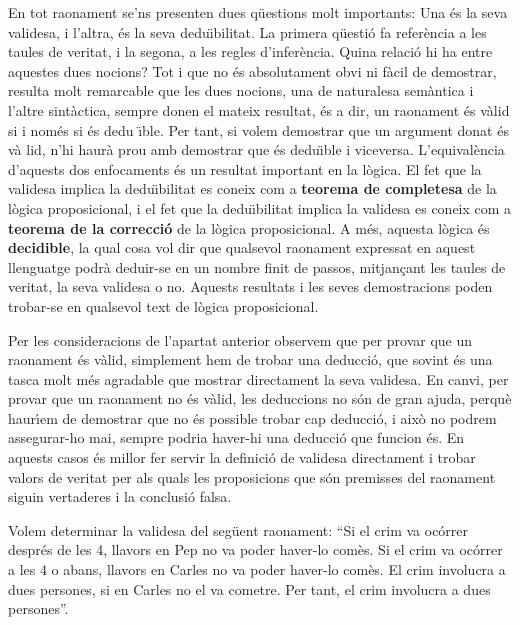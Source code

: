 En tot raonament se'ns presenten dues q\"{u}estions molt importants: Una
\'{e}s la seva validesa, i l'altra, \'{e}s la seva dedu\"{\i}bilitat. La
primera q\"{u}esti\'{o} fa refer\`{e}ncia a les taules de veritat, i la
segona, a les regles d'infer\`{e}ncia. Quina relaci\'{o} hi ha entre
aquestes dues nocions? Tot i que no \'{e}s absolutament obvi ni f\`{a}cil de
demostrar, resulta molt remarcable que les dues nocions, una de naturalesa
sem\`{a}ntica i l'altre sint\`{a}ctica, sempre donen el mateix resultat,
\'{e}s a dir, un raonament \'{e}s v\`{a}lid si i nom\'{e}s si \'{e}s dedu%
\"{\i}ble. Per tant, si volem demostrar que un argument donat \'{e}s v\`{a}%
lid, n'hi haur\`{a} prou amb demostrar que \'{e}s dedu\"{\i}ble i viceversa.
L'equival\`{e}ncia d'aquests dos enfocaments \'{e}s un resultat important en
la l\`{o}gica. El fet que la validesa implica la dedu\"{\i}bilitat es coneix
com a \textbf{teorema de completesa} de la l\`{o}gica proposicional, i el
fet que la dedu\"{\i}bilitat implica la validesa es coneix com a \textbf{%
teorema de la correcci\'{o}} de la l\`{o}gica proposicional. A m\'{e}s,
aquesta l\`{o}gica \'{e}s \textbf{decidible}, la qual cosa vol dir que
qualsevol raonament expressat en aquest llenguatge podr\`{a} deduir-se en un
nombre finit de passos, mitjan\c{c}ant les taules de veritat, la seva
validesa o no. Aquests resultats i les seves demostracions poden trobar-se
en qualsevol text de l\`{o}gica proposicional.

\bigskip

Per les consideracions de l'apartat anterior observem que per provar que un
raonament \'{e}s v\`{a}lid, simplement hem de trobar una deducci\'{o}, que
sovint \'{e}s una tasca molt m\'{e}s agradable que mostrar directament la
seva validesa. En canvi, per provar que un raonament no \'{e}s v\`{a}lid,
les deduccions no s\'{o}n de gran ajuda, perqu\`{e} haur\'{\i}em de
demostrar que no \'{e}s possible trobar cap deducci\'{o}, i aix\`{o} no
podrem assegurar-ho mai, sempre podria haver-hi una deducci\'{o} que funcion%
\'{e}s. En aquests casos \'{e}s millor fer servir la definici\'{o} de
validesa directament i trobar valors de veritat per als quals les
proposicions que s\'{o}n premisses del raonament siguin vertaderes i la
conclusi\'{o} falsa.

\begin{exem}
Volem determinar la validesa del seg\"{u}ent raonament: \textquotedblleft Si
el crim va oc\'{o}rrer despr\'{e}s de les 4, llavors en Pep no va poder
haver-lo com\`{e}s. Si el crim va oc\'{o}rrer a les 4 o abans, llavors en
Carles no va poder haver-lo com\`{e}s. El crim involucra a dues persones, si
en Carles no el va cometre. Per tant, el crim involucra a dues
persones\textquotedblright.
\end{exem}

